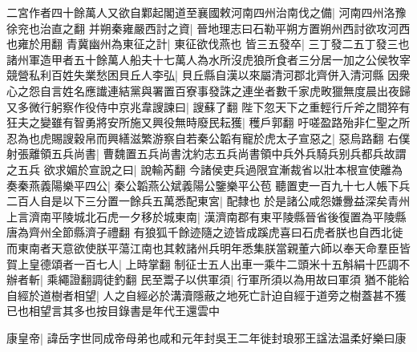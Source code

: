 二宮作者四十餘萬人又欲自鄴起閣道至襄國敕河南四州治南伐之備|{
	河南四州洛豫徐兖也治直之翻}
并朔秦雍嚴西討之資|{
	晉地理志曰石勒平朔方置朔州西討欲攻河西也雍於用翻}
青冀幽州為東征之計|{
	東征欲伐燕也}
皆三五發卒|{
	三丁發二五丁發三也}
諸州軍造甲者五十餘萬人船夫十七萬人為水所沒虎狼所食者三分居一加之公侯牧宰競營私利百姓失業愁困貝丘人李弘|{
	貝丘縣自漢以來屬清河郡北齊併入清河縣}
因衆心之怨自言姓名應䜟連結黨與署置百寮事發誅之連坐者數千家虎畋獵無度晨出夜歸又多微行躬察作役侍中京兆韋謏諫曰|{
	謏蘇了翻}
陛下忽天下之重輕行斤斧之間猝有狂夫之變雖有智勇將安所施又興役無時廢民耘獲|{
	穫戶郭翻}
吁嗟盈路殆非仁聖之所忍為也虎賜謏穀帛而興繕滋繁游察自若秦公韜有寵於虎太子宣惡之|{
	惡烏路翻}
右僕射張離領五兵尚書|{
	曹魏置五兵尚書沈約志五兵尚書領中兵外兵騎兵别兵都兵故謂之五兵}
欲求媚於宣說之曰|{
	說輸芮翻}
今諸侯吏兵過限宜漸裁省以壯本根宣使離為奏秦燕義陽樂平四公|{
	秦公韜燕公斌義陽公鑒樂平公苞}
聽置吏一百九十七人帳下兵二百人自是以下三分置一餘兵五萬悉配東宮|{
	配隸也}
於是諸公咸怨嫌釁益深矣青州上言濟南平陵城北石虎一夕移於城東南|{
	漢濟南郡有東平陵縣晉省後復置為平陵縣唐為齊州全節縣濟子禮翻}
有狼狐千餘迹隨之迹皆成蹊虎喜曰石虎者朕也自西北徙而東南者天意欲使朕平蕩江南也其敕諸州兵明年悉集朕當親董六師以奉天命羣臣皆賀上皇德頌者一百七人|{
	上時掌翻}
制征士五人出車一乘牛二頭米十五斛絹十匹調不辦者斬|{
	乘繩證翻調徒釣翻}
民至鬻子以供軍須|{
	行軍所須以為用故曰軍須}
猶不能給自經於道樹者相望|{
	人之自經必於溝瀆隱蔽之地死亡計迫自經于道旁之樹蓋甚不獲已也相望言其多也按目錄書是年代王還雲中}


康皇帝|{
	諱岳字世同成帝母弟也咸和元年封吳王二年徙封琅邪王諡法温柔好樂曰康}



